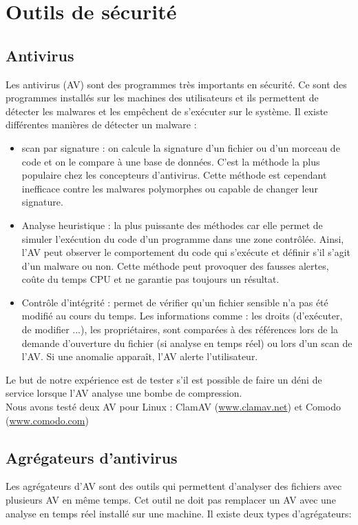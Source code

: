 \documentclass{svjour3}
\begin{document}
\section{Outils de sécurité}
\label{2.Outils}

\subsection{Antivirus}
\label{2.1antivirus}
Les antivirus (AV) sont des programmes très importants en sécurité. Ce sont des programmes installés sur les machines des utilisateurs et ils permettent de détecter les malwares et les empêchent de s’exécuter sur le système. Il existe différentes manières de détecter un malware : 
\begin{itemize}
\item scan par signature : on calcule la signature d'un fichier ou d'un morceau de code et on le compare à une base de données. C'est la méthode la plus populaire chez les concepteurs d'antivirus. Cette méthode est cependant inefficace contre les malwares polymorphes ou capable de changer leur signature.
\item Analyse heuristique : la plus puissante des méthodes car elle permet de simuler l’exécution du code d'un programme dans une zone contrôlée. Ainsi, l'AV peut observer le comportement du code qui s’exécute et définir s'il s'agit d'un malware ou non. Cette méthode peut provoquer des fausses alertes, coûte du temps CPU et ne garantie pas toujours un résultat.
\item Contrôle d'intégrité : permet de vérifier qu'un fichier sensible n'a pas été modifié au cours du temps. Les informations comme : les droits (d'exécuter, de modifier ...), les propriétaires, sont comparées à des références lors de la demande d'ouverture du fichier (si analyse en temps réel) ou lors d'un scan de l'AV. Si une anomalie apparaît, l'AV alerte l'utilisateur.\\
\end{itemize}
Le but de notre expérience est de tester s'il est possible de faire un déni de service lorsque l'AV analyse une bombe de compression.\\
Nous avons testé deux AV pour Linux : ClamAV (\url{www.clamav.net}) et Comodo (\url{www.comodo.com})\\

\subsection{Agrégateurs d'antivirus}
\label{2.2agrégateurs}
Les agrégateurs d'AV sont des outils qui permettent d'analyser des fichiers avec plusieurs AV en même temps. Cet outil ne doit pas remplacer un AV avec une analyse en temps réel installé sur une machine. Il existe deux types d’agrégateurs:  
\end{document}

